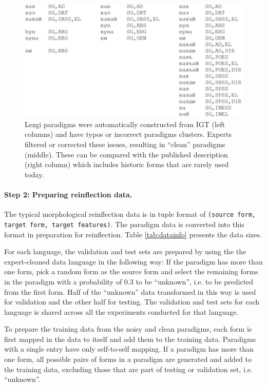 \begin{figure}
    \centering
    \includegraphics[width=13cm]{figs/IGT2P-paradigms.pdf}
    \caption[Noisy to Clean Paradigms]{Lezgi paradigms were automatically constructed from IGT (left columns) and have typos or incorrect paradigms clusters. Experts filtered or corrected these issues, resulting in ``clean'' paradigms (middle). These can be compared with the published description (right column) which includes historic forms that are rarely used today.}
    \label{fig:cleaning}
\end{figure}

\paragraph{Step 2: Preparing reinflection data.}
The typical morphological reinflection data is in tuple format of \texttt{(source form, target form, target features)}. The paradigm data is converted into this format in preparation for reinflection. Table \ref{tab:datainfo} presents the data sizes. 

For each language, the validation and test sets are prepared by using the the expert-cleaned data language in the following way: If the paradigm has more than one form, pick a random form as the source form and select the remaining forms in the paradigm with a probability of 0.3 to be ``unknown'', i.e. to be predicted from the first form. Half of the ``unknown'' data transformed in this way is used for validation and the other half for testing. The validation and test sets for each language is shared across all the experiments conducted for that language.

To prepare the training data from the noisy and clean paradigms, each form is first mapped in the data to itself and add them to the training data. Paradigms with a single entry have only self-to-self mapping. If a paradigm has more than one form, all possible pairs of forms in a paradigm are generated and added to the training data, excluding those that are part of testing or validation set, i.e. ``unknown''.
 

